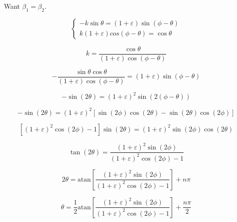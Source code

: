 \documentclass{article}
\begin{document}
Want $\beta_1 = \beta_2$.

\begin{equation}
	\begin{cases}
		-k\sin\theta=(1+\varepsilon)\sin(\phi-\theta)\\
		k(1+\varepsilon)cos(\phi-\theta)=\cos\theta
	\end{cases}
\end{equation}

\begin{equation}
	k = \frac{\cos\theta}{(1+\varepsilon)\cos(\phi-\theta)}
\end{equation}

\begin{equation}
	-\frac{\sin\theta\cos\theta}{(1+\varepsilon)\cos(\phi-\theta)}=(1+\varepsilon)\sin(\phi-\theta)
\end{equation}

\begin{equation}
	-\sin(2\theta)=(1+\varepsilon)^2\sin(2(\phi-\theta))
\end{equation}

\begin{equation}
	-\sin(2\theta)=(1+\varepsilon)^2\left[\sin(2\phi)\cos(2\theta) - \sin(2\theta)\cos(2\phi)\right]
\end{equation}

\begin{equation}
	\left[(1+\varepsilon)^2\cos(2\phi)-1\right]\sin(2\theta)=(1+\varepsilon)^2\sin(2\phi)\cos(2\theta)
\end{equation}

\begin{equation}
	\tan(2\theta)=\frac{(1+\varepsilon)^2\sin(2\phi)}{(1+\varepsilon)^2\cos(2\phi)-1}
\end{equation}

\begin{equation}
	2\theta = \text{atan}\left[\frac{(1+\varepsilon)^2\sin(2\phi)}{(1+\varepsilon)^2\cos(2\phi)-1}\right]+n\pi
\end{equation}

\begin{equation}
	\theta = \frac{1}{2}\text{atan}\left[\frac{(1+\varepsilon)^2\sin(2\phi)}{(1+\varepsilon)^2\cos(2\phi)-1}\right]+\frac{n\pi}{2}
\end{equation}
\end{document}
